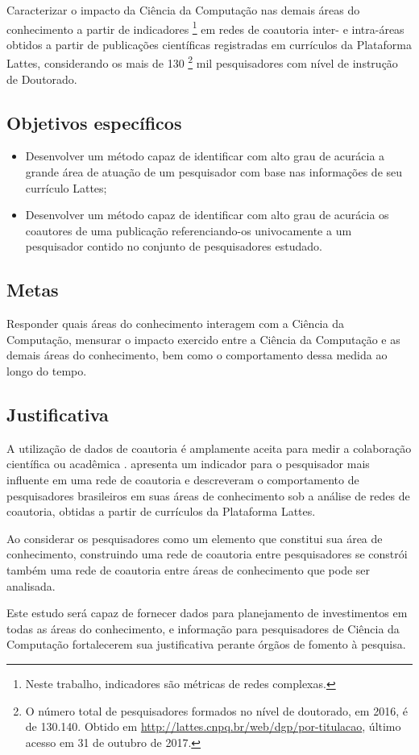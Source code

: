 Caracterizar o impacto da Ciência da Computação nas demais áreas do conhecimento a partir de indicadores \footnote{Neste trabalho, indicadores são métricas de redes complexas.} em redes de coautoria inter- e intra-áreas obtidos a partir de publicações científicas registradas em currículos da Plataforma Lattes, considerando os mais de 130 \footnote{O número total de pesquisadores formados no nível de doutorado, em 2016, é de 130.140. Obtido em \url{http://lattes.cnpq.br/web/dgp/por-titulacao}, último acesso em 31 de outubro de 2017.} mil pesquisadores com nível de instrução de Doutorado.

\subsection{Objetivos específicos}

\begin{itemize}
\item Desenvolver um método capaz de identificar com alto grau de acurácia a grande área de atuação de um pesquisador com base nas informações de seu currículo Lattes;
\item Desenvolver um método capaz de identificar com alto grau de acurácia os coautores de uma publicação referenciando-os univocamente a um pesquisador contido no conjunto de pesquisadores estudado.
\end{itemize}

\subsection{Metas}

Responder quais áreas do conhecimento interagem com a Ciência da Computação, mensurar o impacto exercido entre a Ciência da Computação e as demais áreas do conhecimento, bem como o comportamento dessa medida ao longo do tempo.

\subsection{Justificativa}

A utilização de dados de coautoria é amplamente aceita para medir a colaboração científica ou acadêmica \cite{katz1997research}.  apresenta um indicador para o pesquisador mais influente em uma rede de coautoria e  descreveram o comportamento de pesquisadores brasileiros em suas áreas de conhecimento sob a análise de redes de coautoria, obtidas a partir de currículos da Plataforma Lattes.

Ao considerar os pesquisadores como um elemento que constitui sua área de conhecimento, construindo uma rede de coautoria entre pesquisadores se constrói também uma rede de coautoria entre áreas de conhecimento que pode ser analisada.

Este estudo será capaz de fornecer dados para planejamento de investimentos em todas as áreas do conhecimento, e informação para pesquisadores de Ciência da Computação fortalecerem sua justificativa perante órgãos de fomento à pesquisa.
